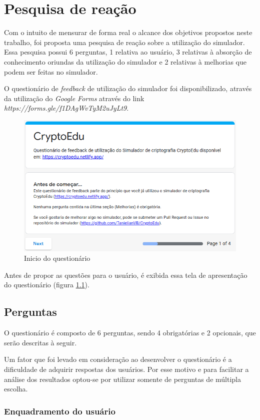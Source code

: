 \chapter{Pesquisa de reação}
\label{char:pesquisa}
Com o intuito de mensurar de forma real o alcance dos objetivos propostos neste trabalho, foi proposta uma pesquisa de reação sobre a utilização do simulador. Essa pesquisa possui 6 perguntas, 1 relativa ao usuário, 3 relativas à absorção de conhecimento oriundas da utilização do simulador e 2 relativas à melhorias que podem ser feitas no simulador.

O questionário de \textit{feedback} de utilização do simulador foi disponibilizado, através da utilização do \textit{Google Forms} através do link \textit{https://forms.gle/f1DAgWvTyM2uJyLt9}.

\begin{figure}[H]
    \centering
    \caption{Inicio do questionário}
    \label{fig:inicioquestionario}
    \includegraphics[width=0.75\linewidth]{Questionario/QI.png}
\end{figure}

Antes de propor as questões para o usuário, é exibida essa tela de apresentação do questionário (figura \ref{fig:inicioquestionario}).

\section{Perguntas}
O questionário é composto de 6 perguntas, sendo 4 obrigatórias e 2 opcionais, que serão descritas à seguir.

Um fator que foi levado em consideração ao desenvolver o  questionário é a dificuldade de adquirir respostas dos usuários. Por esse motivo e para facilitar a análise dos resultados optou-se por utilizar somente de perguntas de múltipla escolha.

\subsection{Enquadramento do usuário}

